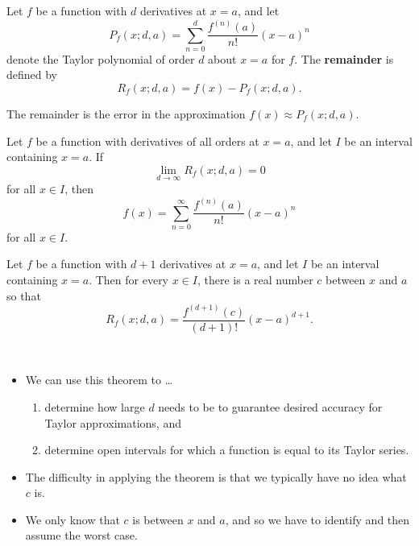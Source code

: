 

\begin{definition}
Let $f$ be a function with $d$ derivatives at $x=a$, and let 
\begin{equation*}
P_f(x; d, a) = \sum_{n=0}^d\frac{f^{(n)}(a)}{n!}(x-a)^n
\end{equation*}
denote the Taylor polynomial of order $d$ about $x=a$ for $f$.
The \textbf{remainder} is defined by
\begin{equation*}
R_f(x;d,a) = f(x) - P_f(x;d,a).
\end{equation*}
\end{definition}

\begin{remark}
The remainder is the error in the approximation $f(x)\approx P_f(x;d,a)$.
\end{remark}

\begin{theorem}
Let $f$ be a function with derivatives of all orders at $x=a$, and let $I$ be an interval containing $x=a$.
If
\begin{equation*}
\lim_{d\to\infty}R_f(x; d, a) = 0
\end{equation*}
for all $x\in I$, then
\begin{equation*}
f(x) = \sum_{n=0}^\infty \frac{f^{(n)}(a)}{n!}(x-a)^n
\end{equation*}
for all $x\in I$.
\end{theorem}

\begin{theorem}
Let $f$ be a function with $d+1$ derivatives at $x=a$, and let $I$ be an interval containing $x=a$.
Then for every $x\in I$, there is a real number $c$ between $x$ and $a$ so that
\begin{equation*}
R_f(x;d,a) = \frac{f^{(d+1)}(c)}{(d+1)!}(x-a)^{d+1}.
\end{equation*}
\end{theorem}

\begin{remark}\,
\begin{itemize}
\item We can use this theorem to \dots
\begin{enumerate}
\item determine how large $d$ needs to be to guarantee desired accuracy for Taylor approximations, and
\item determine open intervals for which a function is equal to its Taylor series.
\end{enumerate}
\item The difficulty in applying the theorem is that we typically have no idea what $c$ is.
\item We only know that $c$ is between $x$ and $a$, and so we have to identify and then assume the worst case.
\end{itemize}
\end{remark}

